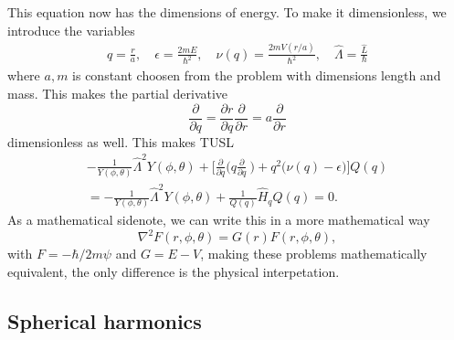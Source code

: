 \documentclass{article}
\begin{document}
        This equation now has the dimensions of energy. To make it dimensionless, we introduce the variables
        \begin{align*}
            q = \frac{r}{a}, \quad \epsilon = \frac{2mE}{\hbar^2}, \quad \nu(q) = \frac{2mV(r / a)}{\hbar^2}, \quad \hat \Lambda = \frac{\hat L}{\hbar} 
        \end{align*}
        where \(a, m\) is constant choosen from the problem with dimensions length and mass. This makes the partial derivative
        \begin{equation*}
            \frac{\partial}{\partial q} = \frac{\partial r}{\partial q} \frac{\partial}{\partial r} = a \frac{\partial }{\partial r}
        \end{equation*}
        dimensionless as well. This makes TUSL
        \begin{align}
            \label{dimensionless TUSL}
            \nonumber -\frac{1}{Y(\phi, \theta)}{\hat \Lambda}^2 Y(\phi, \theta) + \bigg[\frac{\partial}{\partial q}\bigg(q \frac{\partial}{\partial q}\ \bigg) + q^2 \big(\nu(q) - \epsilon \big) \bigg] Q(q) \\
            = -\frac{1}{Y(\phi, \theta)}{\hat \Lambda}^2 Y(\phi, \theta) + \frac{1}{Q(q)}\hat H_q Q(q)  = 0.
        \end{align}
        As a mathematical sidenote, we can write this in a more mathematical way
        \begin{equation*}
            \nabla^2 F(r, \phi, \theta) = G(r) F(r, \phi, \theta),
        \end{equation*}
        with \(F = - \hbar /2m \psi\) and \(G = E - V\), making these problems mathematically equivalent, the only difference is the physical interpetation.

    \subsection*{Spherical harmonics}
\end{document}
